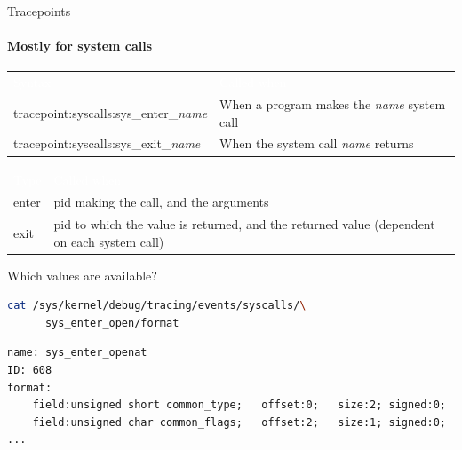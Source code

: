 \begin{reveals}
\begin{frame}[c,fragile]{Tracepoints}
  \framesubtitle{Mostly for system calls}

  \begin{center}
      \color{deepblue}
    \begin{tabular}{|p{}p{}|}
      \arrayrulecolor{deepblue}
          {\cellcolor{deepblue}\textcolor{white}{Syntax}} &
                                                          {\cellcolor{deepblue}\textcolor{white}{Called when}} \\
      tracepoint:syscalls:sys\_enter\_\emph{name} &
                                                                            When a program makes the \emph{name} system call\\
      tracepoint:syscalls:sys\_exit\_\emph{name} &
                                                                            When the system call \emph{name} returns \\\hline
    \end{tabular}
  \end{center}
  \vfill
  \begin{center}
      \color{deepblue}
    \begin{tabular}{|p{}p{}|}
      \arrayrulecolor{deepblue}
          {\cellcolor{deepblue}\textcolor{white}{Type}} &
                                                          {\cellcolor{deepblue}\textcolor{white}{Called when}} \\
      enter & pid making the call, and the arguments\\
      exit & pid to which the value is returned, and the returned value (dependent on each system call)\\\hline
    \end{tabular}
  \end{center}

  \vfill

  \begin{block}{Which values are available?}
\begin{lstlisting}[language=bash]
cat /sys/kernel/debug/tracing/events/syscalls/\
      sys_enter_open/format
\end{lstlisting}
\begin{verbatim}
name: sys_enter_openat
ID: 608
format:
	field:unsigned short common_type;	offset:0;	size:2;	signed:0;
	field:unsigned char common_flags;	offset:2;	size:1;	signed:0;
...
\end{verbatim}


\end{block}
\end{frame}
\end{reveals}
